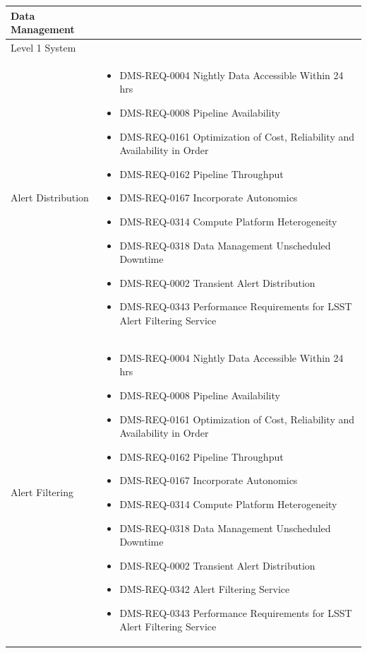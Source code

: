 \documentclass[DM,lsstdraft,toc]{lsstdoc}
\begin{document}
\begin{xtabular}{|p{0.1\textwidth}|p{0.85\textwidth}|}
Data Management & \\ \hline
Level 1 System & \\ \hline
Alert Distribution &
\begin{itemize}
\item DMS-REQ-0004 Nightly Data Accessible Within 24 hrs
\item DMS-REQ-0008 Pipeline Availability
\item DMS-REQ-0161 Optimization of Cost, Reliability and Availability in Order
\item DMS-REQ-0162 Pipeline Throughput
\item DMS-REQ-0167 Incorporate Autonomics
\item DMS-REQ-0314 Compute Platform Heterogeneity
\item DMS-REQ-0318 Data Management Unscheduled Downtime
\item DMS-REQ-0002 Transient Alert Distribution
\item DMS-REQ-0343 Performance Requirements for LSST Alert Filtering Service
\end{itemize} \\ \hline
Alert Filtering &
\begin{itemize}
\item DMS-REQ-0004 Nightly Data Accessible Within 24 hrs
\item DMS-REQ-0008 Pipeline Availability
\item DMS-REQ-0161 Optimization of Cost, Reliability and Availability in Order
\item DMS-REQ-0162 Pipeline Throughput
\item DMS-REQ-0167 Incorporate Autonomics
\item DMS-REQ-0314 Compute Platform Heterogeneity
\item DMS-REQ-0318 Data Management Unscheduled Downtime
\item DMS-REQ-0002 Transient Alert Distribution
\item DMS-REQ-0342 Alert Filtering Service
\item DMS-REQ-0343 Performance Requirements for LSST Alert Filtering Service

\end{itemize}
\end{xtabular}
\end{document}
